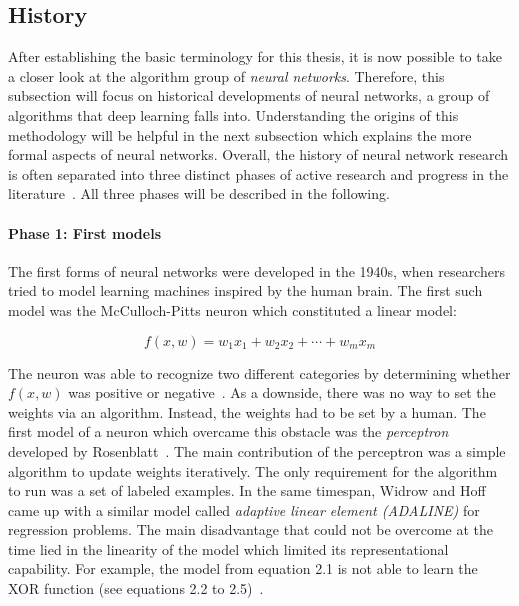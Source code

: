\subsection{History}
\label{sub:dl_history}

After establishing the basic terminology for this thesis, 
it is now possible to take a closer look at the algorithm group of 
\textit{neural networks}. Therefore, this subsection will focus on historical
developments of neural networks, a group of algorithms that deep learning falls
into.
Understanding the origins of this methodology will be helpful in the next 
subsection which explains the more formal aspects of neural networks.
Overall, the history of neural network research is often separated into three
distinct phases of active research and progress in the literature~\cite{Goodfellow2016}.
All three phases will be described in the following.

\paragraph{Phase 1: First models}

The first forms of neural networks were developed in the 1940s, when
researchers tried to model learning machines inspired by the human brain.
The first such model was the McCulloch-Pitts neuron which constituted a linear
model:

\begin{equation}
  f (x, w) = w_1 x_1 + w_2 x_2 + \cdots + w_m x_m
\end{equation}

The neuron was able to recognize two different categories by determining
whether $f(x, w)$ was positive or negative~\cite{McCulloch1943}.
As a downside, there was no way to set the weights via an algorithm.
Instead, the weights had to be set by a human.
The first model of a neuron which overcame this obstacle was the \textit{perceptron}
developed by Rosenblatt~\cite{Rosenblatt1958}. The main contribution of the
perceptron was a simple algorithm to update weights iteratively.
The only requirement for the algorithm to run was a set of labeled examples.
In the same timespan, Widrow and Hoff~\cite{Widrow1960} came up with a similar
model called \textit{adaptive linear element (ADALINE)} for regression problems.
The main disadvantage that could not be overcome at the time lied in the 
linearity of the model which limited its representational capability.
For example, the model from equation 2.1 is not able to learn the XOR function 
(see equations 2.2 to 2.5)~\cite{Minsky1969}.


